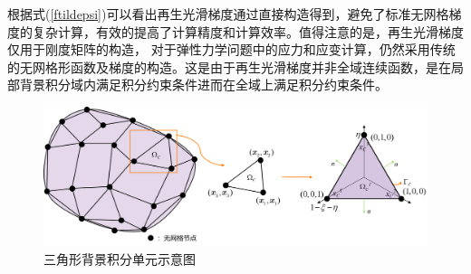 根据式(\ref{ftildepsi})可以看出再生光滑梯度通过直接构造得到，避免了标准无网格梯度的复杂计算，有效的提高了计算精度和计算效率。值得注意的是，再生光滑梯度仅用于刚度矩阵的构造，
对于弹性力学问题中的应力和应变计算，仍然采用传统的无网格形函数及梯度的构造。这是由于再生光滑梯度并非全域连续函数，是在局部背景积分域内满足积分约束条件进而在全域上满足积分约束条件。
\begin{figure}[H]
\centering
    \includegraphics[scale=0.5]{figure/C2/RKGSI.png}
    \caption{三角形背景积分单元示意图}\label{C2RKGSI}
\end{figure}

